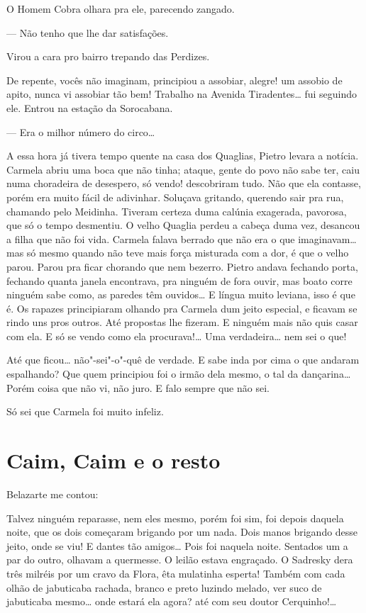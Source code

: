 O Homem Cobra olhara pra ele, parecendo zangado.

--- Não tenho que lhe dar satisfações.

Virou a cara pro bairro trepando das Perdizes.

De repente, vocês não imaginam, principiou a assobiar, alegre! um
assobio de apito, nunca vi assobiar tão bem! Trabalho na Avenida
Tiradentes\ldots{} fui seguindo ele. Entrou na estação da Sorocabana.

--- Era o milhor número do circo\ldots{}

A essa hora já tivera tempo quente na casa dos Quaglias, Pietro levara a
notícia. Carmela abriu uma boca que não tinha; ataque, gente do povo não
sabe ter, caiu numa choradeira de desespero, só vendo! descobriram tudo.
Não que ela contasse, porém era muito fácil de adivinhar. Soluçava
gritando, querendo sair pra rua, chamando pelo Meidinha. Tiveram certeza
duma calúnia exagerada, pavorosa, que só o tempo desmentiu. O velho
Quaglia perdeu a cabeça duma vez, desancou a filha que não foi vida.
Carmela falava berrado que não era o que imaginavam\ldots{} mas só mesmo
quando não teve mais força misturada com a dor, é que o velho parou.
Parou pra ficar chorando que nem bezerro. Pietro andava fechando porta,
fechando quanta janela encontrava, pra ninguém de fora ouvir, mas boato
corre ninguém sabe como, as paredes têm ouvidos\ldots{} E língua muito
leviana, isso é que é. Os rapazes principiaram olhando pra Carmela dum
jeito especial, e ficavam se rindo uns pros outros. Até propostas lhe
fizeram. E ninguém mais não quis casar com ela. E só se vendo como ela
procurava!\ldots{} Uma verdadeira\ldots{} nem sei o que!

Até que ficou\ldots{} não"-sei"-o"-quê de verdade. E sabe inda por cima o que
andaram espalhando? Que quem principiou foi o irmão dela mesmo, o tal da
dançarina\ldots{} Porém coisa que não vi, não juro. E falo sempre que não
sei.

Só sei que Carmela foi muito infeliz.

\chapter{Caim, Caim e o resto}

Belazarte me contou:

Talvez ninguém reparasse, nem eles mesmo, porém foi sim, foi depois
daquela noite, que os dois começaram brigando por um nada. Dois manos
brigando desse jeito, onde se viu! E dantes tão amigos\ldots{} Pois foi
naquela noite. Sentados um a par do outro, olhavam a quermesse. O leilão
estava engraçado. O Sadresky dera três milréis por um cravo da Flora,
êta mulatinha esperta! Também com cada olhão de jabuticaba rachada,
branco e preto luzindo melado, ver suco de jabuticaba mesmo\ldots{} onde
estará ela agora? até com seu doutor Cerquinho!\ldots{}


